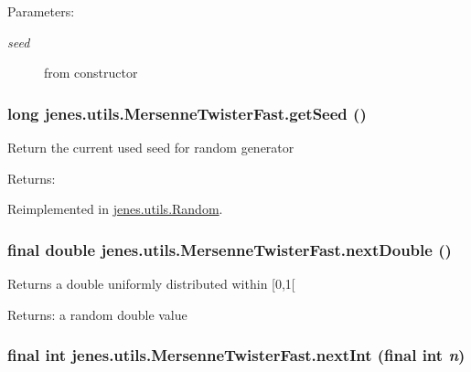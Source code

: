 \begin{Desc}
\item[Parameters:]
\begin{description}
\item[{\em seed}]from constructor \end{description}
\end{Desc}
\hypertarget{classjenes_1_1utils_1_1_mersenne_twister_fast_88963c0469e0bad7a1834469cf0f7a10}{
\subsubsection[getSeed]{\setlength{\rightskip}{0pt plus 5cm}long jenes.utils.MersenneTwisterFast.getSeed ()}}
\label{classjenes_1_1utils_1_1_mersenne_twister_fast_88963c0469e0bad7a1834469cf0f7a10}


Return the current used seed for random generator \begin{Desc}
\item[Returns:]\end{Desc}


Reimplemented in \hyperlink{classjenes_1_1utils_1_1_random_55f9b0a836c137e520658f55ad806859}{jenes.utils.Random}.\hypertarget{classjenes_1_1utils_1_1_mersenne_twister_fast_64238ab497c1e504c798355f682ea2b9}{
\subsubsection[nextDouble]{\setlength{\rightskip}{0pt plus 5cm}final double jenes.utils.MersenneTwisterFast.nextDouble ()}}
\label{classjenes_1_1utils_1_1_mersenne_twister_fast_64238ab497c1e504c798355f682ea2b9}


Returns a double uniformly distributed within \mbox{[}0,1\mbox{[} 

\begin{Desc}
\item[Returns:]a random double value \end{Desc}
\hypertarget{classjenes_1_1utils_1_1_mersenne_twister_fast_e66ea69e37e4866fbb3beecb4e66577a}{
\subsubsection[nextInt]{\setlength{\rightskip}{0pt plus 5cm}final int jenes.utils.MersenneTwisterFast.nextInt (final int {\em n})}}
\label{classjenes_1_1utils_1_1_mersenne_twister_fast_e66ea69e37e4866fbb3beecb4e66577a}


